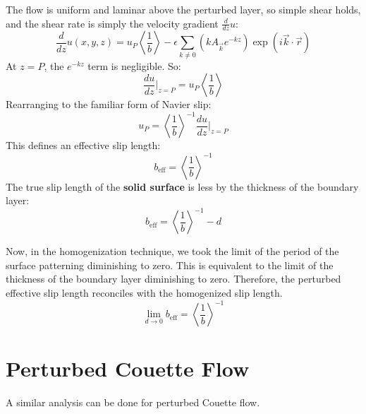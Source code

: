 \documentclass[12pt, a4paper, twoside, openright]{book}
\newcommand{\beff}{\ensuremath{b_{\mathrm{eff}}}}
\begin{document}
The flow is uniform and laminar above the perturbed layer, so simple shear holds, and the shear rate is simply the velocity gradient $\frac{d}{dz} u$:
\begin{equation}
\frac{d}{dz} u(x,y,z) = 
 u_P\left< \frac{1}{b} \right>
 - \epsilon \sum_{k \neq 0} 
\left( k A_{\vec{k}} e^{-kz} \right)
\exp(i \vec{k}\cdot \vec{r})
\end{equation}
At $z = P$, the $e^{-kz}$ term is negligible. So:
\begin{equation}
\frac{du}{dz} \rvert_{z=P} = u_P\left< \frac{1}{b} \right>
\end{equation}
Rearranging to the familiar form of Navier slip:
\begin{equation}
 u_P = \left< \frac{1}{b} \right>^{-1} \frac{du}{dz} \rvert_{z=P}
\end{equation}
This defines an effective slip length:
\begin{equation}
\beff = \left< \frac{1}{b} \right>^{-1}
\end{equation}
The true slip length of the \textbf{solid surface} is less by the thickness of the boundary layer:
\begin{equation}
\beff = \left< \frac{1}{b} \right>^{-1} - d
\end{equation}

Now, in the homogenization technique, we took the limit of the period of the surface patterning diminishing to zero.  This is equivalent to the limit of the thickness of the boundary layer diminishing to zero.  Therefore, the perturbed effective slip length reconciles with the homogenized slip length.
\begin{equation}
\lim_{d \to 0} \beff = \left< \frac{1}{b} \right>^{-1}
\end{equation}

\section*{Perturbed Couette Flow}

A similar analysis can be done for perturbed Couette flow.
\end{document}
